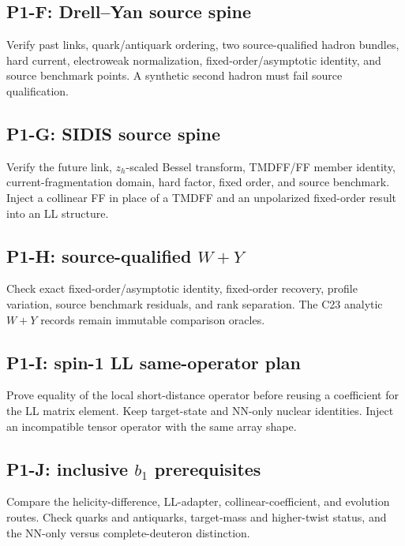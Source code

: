 \documentclass[11pt]{article}
\begin{document}
\subsection{P1-F: Drell--Yan source spine}

Verify past links, quark/antiquark ordering, two source-qualified hadron bundles, hard current, electroweak normalization, fixed-order/asymptotic identity, and source benchmark points.  A synthetic second hadron must fail source qualification.

\subsection{P1-G: SIDIS source spine}

Verify the future link, \(z_h\)-scaled Bessel transform, TMDFF/FF member identity, current-fragmentation domain, hard factor, fixed order, and source benchmark.  Inject a collinear FF in place of a TMDFF and an unpolarized fixed-order result into an LL structure.

\subsection{P1-H: source-qualified \texorpdfstring{\(W+Y\)}{W+Y}}

Check exact fixed-order/asymptotic identity, fixed-order recovery, profile variation, source benchmark residuals, and rank separation.  The C23 analytic \(W+Y\) records remain immutable comparison oracles.

\subsection{P1-I: spin-1 LL same-operator plan}

Prove equality of the local short-distance operator before reusing a coefficient for the LL matrix element.  Keep target-state and NN-only nuclear identities.  Inject an incompatible tensor operator with the same array shape.

\subsection{P1-J: inclusive \texorpdfstring{\(b_1\)}{b1} prerequisites}

Compare the helicity-difference, LL-adapter, collinear-coefficient, and evolution routes.  Check quarks and antiquarks, target-mass and higher-twist status, and the NN-only versus complete-deuteron distinction.
\end{document}
